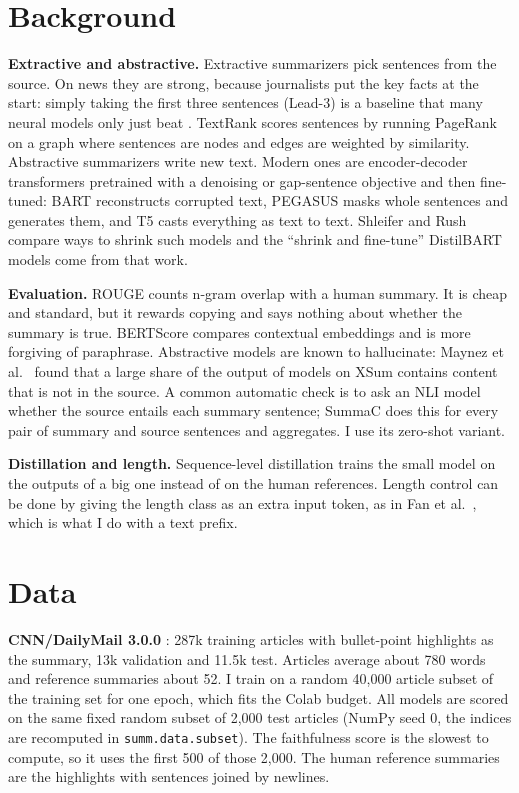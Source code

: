 \documentclass[11pt,a4paper]{article}
\begin{document}
\section{Background}

\textbf{Extractive and abstractive.} Extractive summarizers pick sentences from the source. On news they
are strong, because journalists put the key facts at the start: simply taking the first three sentences
(Lead-3) is a baseline that many neural models only just beat \cite{see17}. TextRank \cite{mihalcea04}
scores sentences by running PageRank on a graph where sentences are nodes and edges are weighted by
similarity. Abstractive summarizers write new text. Modern ones are encoder-decoder transformers
pretrained with a denoising or gap-sentence objective and then fine-tuned: BART \cite{lewis20} reconstructs
corrupted text, PEGASUS \cite{zhang20} masks whole sentences and generates them, and T5 \cite{raffel20}
casts everything as text to text. Shleifer and Rush \cite{shleifer20} compare ways to shrink such models
and the ``shrink and fine-tune'' DistilBART models come from that work.

\textbf{Evaluation.} ROUGE \cite{lin04} counts n-gram overlap with a human summary. It is cheap and standard,
but it rewards copying and says nothing about whether the summary is true. BERTScore \cite{zhang20bs}
compares contextual embeddings and is more forgiving of paraphrase. Abstractive models are known to
hallucinate: Maynez et al.\ \cite{maynez20} found that a large share of the output of models on XSum
contains content that is not in the source. A common automatic check is to ask an NLI model whether the
source entails each summary sentence; SummaC \cite{laban22} does this for every pair of summary and source
sentences and aggregates. I use its zero-shot variant.

\textbf{Distillation and length.} Sequence-level distillation \cite{kim16} trains the small model on the
outputs of a big one instead of on the human references. Length control can be done by giving the length
class as an extra input token, as in Fan et al.\ \cite{fan18}, which is what I do with a text prefix.

\section{Data}

\textbf{CNN/DailyMail 3.0.0} \cite{hermann15,see17}: 287k training articles with bullet-point highlights as
the summary, 13k validation and 11.5k test. Articles average about 780 words and reference summaries about
52. I train on a random 40,000 article subset of the training set for one epoch, which fits the Colab
budget. All models are scored on the same fixed random subset of 2,000 test articles (NumPy seed 0, the
indices are recomputed in \texttt{summ.data.subset}). The faithfulness score is the slowest to compute, so
it uses the first 500 of those 2,000. The human reference summaries are the highlights with sentences joined
by newlines.
\end{document}

